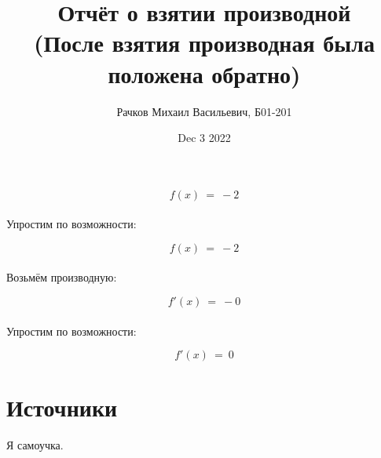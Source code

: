 \documentclass[a4paper, 12pt]{article}
\author{Рачков Михаил Васильевич, Б01-201}
\date{Dec  3 2022}
\title{\textbf{Отчёт о взятии производной} \\(После взятия производная была положена обратно)}
\begin{document}
        \maketitle 
            \maketitle
            \begin{equation}
            f(x)~=~ - 2
    \end{equation}
    \\ Упростим по возможности: \\
            \maketitle
            \begin{equation}
            f(x)~=~ - 2
    \end{equation}
    \\ Возьмём производную: \\
            \maketitle
            \begin{equation}
            f'(x)~=~ - 0
    \end{equation}
    \\ Упростим по возможности: \\
            \maketitle
            \begin{equation}
            f'(x)~=~0
    \end{equation}
    
    \section{Источники}
    Я самоучка.
    
    
\end{document}
